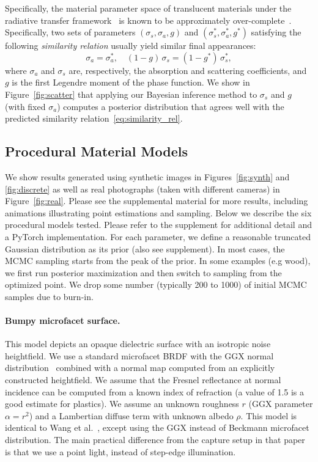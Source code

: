 Specifically, the material parameter space of translucent materials under the radiative transfer framework~\cite{chandrasekhar1960radiative} is known to be approximately over-complete~\cite{Zhao:2014:HSR}.
Specifically, two sets of parameters $(\sigma_s, \sigma_a, g)$ and $(\sigma_s^*, \sigma_a^*, g^*)$ satisfying the following \emph{similarity relation} usually yield similar final appearances:
%
\begin{equation}
	\label{eq:similarity_rel}
	\sigma_a = \sigma_a^*, \quad (1 - g)\,\sigma_s = (1 - g^*)\,\sigma_s^*,
\end{equation}
%
where $\sigma_a$ and $\sigma_s$ are, respectively, the absorption and scattering coefficients, and $g$ is the first Legendre moment of the phase function.
We show in Figure~\ref{fig:scatter} that applying our Bayesian inference method to $\sigma_s$ and $g$ (with fixed $\sigma_a$) computes a posterior distribution that agrees well with the predicted similarity relation~\eqref{eq:similarity_rel}.






\subsection{Procedural Material Models}
\label{ssec:proc_models}
%
We show results generated using synthetic images in Figures~\ref{fig:synth} and \ref{fig:discrete} as well as real photographs (taken with different cameras) in Figure~\ref{fig:real}.
Please see the supplemental material for more results, including animations illustrating point estimations and sampling. Below we describe the six procedural models tested. Please refer to the supplement for additional detail and a \textsf{PyTorch} implementation. For each parameter, we define a reasonable truncated Gaussian distribution as its prior (also see supplement). In most cases, the MCMC sampling starts from the peak of the prior. In some examples (e.g wood), we first run posterior maximization and then switch to sampling from the optimized point. We drop some number (typically 200 to 1000) of initial MCMC samples due to burn-in.

\paragraph*{Bumpy microfacet surface.}
This model depicts an opaque dielectric surface with an isotropic noise heightfield. We use a standard microfacet BRDF with the GGX normal distribution~\cite{Walter2007} combined with a normal map computed from an explicitly constructed heightfield. We assume that the Fresnel reflectance at normal incidence can be computed from a known index of refraction (a value of 1.5 is a good estimate for plastics). We assume an unknown roughness $r$ (GGX parameter $\alpha=r^2$) and a Lambertian diffuse term with unknown albedo $\rho$. This model is identical to Wang et al.~\cite{Wang2011}, except using the GGX instead of Beckmann microfacet distribution. The main practical difference from the capture setup in that paper is that we use a point light, instead of step-edge illumination.

